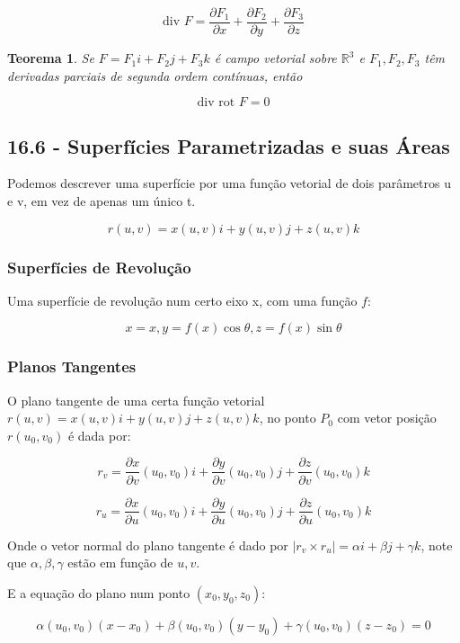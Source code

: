 \documentclass[12pt]{article}
\newtheorem{theorem}{Teorema}[section]
\begin{document}
$$\text{div } F = \dfrac{\partial F_1}{\partial x} + \dfrac{\partial F_2}{\partial y} + \dfrac{\partial F_3}{\partial z}$$

\begin{theorem}
    Se $F = F_1 i + F_2 j + F_3 k$ é campo vetorial sobre $\mathbb{R}^3$ e $F_1, F_2, F_3$ têm derivadas parciais de segunda ordem contínuas, então

    $$\text{div rot } F = 0$$
\end{theorem}

\subsection*{16.6 - Superfícies Parametrizadas e suas Áreas}
\label{s7}

Podemos descrever uma superfície por uma função vetorial de dois parâmetros u e v, em vez de apenas um único t.

$$r(u, v) = x(u, v)i + y(u, v)j + z(u, v)k$$

\subsubsection*{Superfícies de Revolução}

Uma superfície de revolução num certo eixo x, com uma função $f$:

$$x = x, y = f(x) \cos{\theta}, z = f(x) \sin{\theta}$$

\subsubsection*{Planos Tangentes}

O plano tangente de uma certa função vetorial $r(u, v) = x(u, v)i + y(u, v)j + z(u, v)k$, no ponto $P_0$ com vetor posição $r(u_0, v_0)$ é dada por:

$$r_v = \dfrac{\partial x}{\partial v}(u_0, v_0)i + \dfrac{\partial y}{\partial v}(u_0, v_0)j + \dfrac{\partial z}{\partial v}(u_0, v_0)k$$

$$r_u = \dfrac{\partial x}{\partial u}(u_0, v_0)i + \dfrac{\partial y}{\partial u}(u_0, v_0)j + \dfrac{\partial z}{\partial u}(u_0, v_0)k$$

Onde o vetor normal do plano tangente é dado por $|r_v \times r_u| = \alpha i + \beta j + \gamma k$, note que $\alpha, \beta, \gamma$ estão em função de $u, v$.

E a equação do plano num ponto $(x_0, y_0, z_0)$:

$$\alpha(u_0, v_0)(x - x_0) + \beta(u_0, v_0)(y - y_0) + \gamma(u_0, v_0)(z - z_0) = 0$$
\end{document}
